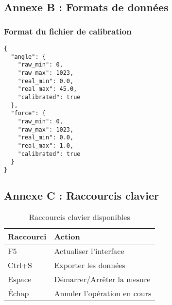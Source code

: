 \documentclass[12pt,a4paper]{article}
\begin{document}
\subsection{Annexe B : Formats de données}

\subsubsection{Format du fichier de calibration}

\begin{lstlisting}
{
  "angle": {
    "raw_min": 0,
    "raw_max": 1023,
    "real_min": 0.0,
    "real_max": 45.0,
    "calibrated": true
  },
  "force": {
    "raw_min": 0,
    "raw_max": 1023,
    "real_min": 0.0,
    "real_max": 1.0,
    "calibrated": true
  }
}
\end{lstlisting}

\subsection{Annexe C : Raccourcis clavier}

\begin{table}[H]
\centering
\begin{tabular}{|l|l|}
\hline
\textbf{Raccourci} & \textbf{Action} \\
\hline
F5 & Actualiser l'interface \\
\hline
Ctrl+S & Exporter les données \\
\hline
Espace & Démarrer/Arrêter la mesure \\
\hline
Échap & Annuler l'opération en cours \\
\hline
\end{tabular}
\caption{Raccourcis clavier disponibles}
\label{tab:shortcuts}
\end{table}
\end{document}
